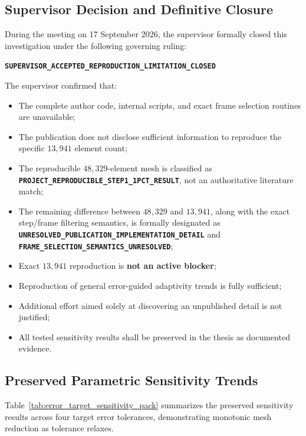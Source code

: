 \subsection{Supervisor Decision and Definitive Closure}
During the meeting on 17 September 2026, the supervisor formally closed this investigation under the following governing ruling:
\begin{center}
  \textbf{\texttt{SUPERVISOR\_ACCEPTED\_REPRODUCTION\_LIMITATION\_CLOSED}}
\end{center}
The supervisor confirmed that:
\begin{itemize}
  \item The complete author code, internal scripts, and exact frame selection routines are unavailable;
  \item The publication does not disclose sufficient information to reproduce the specific $13{,}941$ element count;
  \item The reproducible $48{,}329$-element mesh is classified as \textbf{\texttt{PROJECT\_REPRODUCIBLE\_STEP1\_1PCT\_RESULT}}, not an authoritative literature match;
  \item The remaining difference between $48{,}329$ and $13{,}941$, along with the exact step/frame filtering semantics, is formally designated as \textbf{\texttt{UNRESOLVED\_PUBLICATION\_IMPLEMENTATION\_DETAIL}} and \textbf{\texttt{FRAME\_SELECTION\_SEMANTICS\_UNRESOLVED}};
  \item Exact $13{,}941$ reproduction is \textbf{not an active blocker};
  \item Reproduction of general error-guided adaptivity trends is fully sufficient;
  \item Additional effort aimed solely at discovering an unpublished detail is not justified;
  \item All tested sensitivity results shall be preserved in the thesis as documented evidence.
\end{itemize}

\subsection{Preserved Parametric Sensitivity Trends}
Table~\ref{tab:error_target_sensitivity_pack} summarizes the preserved sensitivity results across four target error tolerances, demonstrating monotonic mesh reduction as tolerance relaxes.

